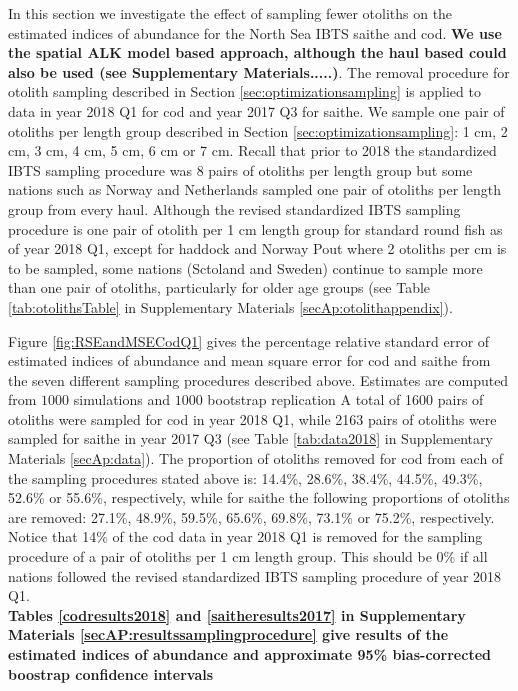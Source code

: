 \documentclass[a4paper 12pt]{article}
\numberwithin{equation}{section}
\begin{document}
In this section we investigate the effect of sampling fewer otoliths on the estimated indices of abundance for the North Sea IBTS saithe and cod. {\bf We use the spatial ALK model based approach, although the haul based could also be used (see Supplementary Materials.....)}. The removal procedure for otolith sampling described in Section \ref{sec:optimizationsampling} is applied to data in year 2018 Q1 for cod and year 2017 Q3 for saithe. We sample one pair of otoliths per length group described in Section \ref{sec:optimizationsampling}: 1 cm, 2 cm, 3 cm, 4 cm, 5 cm, 6 cm or 7 cm. Recall that prior to 2018 the standardized IBTS sampling procedure was 8 pairs of otoliths per length group but some nations such as Norway and Netherlands sampled one pair of otoliths per length group from every haul. Although the revised standardized IBTS sampling procedure is one pair of otolith per 1 cm length group for standard round fish as of year 2018 Q1, except for haddock and Norway Pout where 2 otoliths per cm is to be sampled, some nations (Sctoland and Sweden) continue to sample more than one pair of otoliths, particularly for older age groups (see Table \ref{tab:otolithsTable} in Supplementary Materials \ref{secAp:otolithappendix}).

Figure \ref{fig:RSEandMSECodQ1} gives the percentage relative standard error of estimated indices of abundance and mean square error for cod and saithe from the seven different sampling procedures described above. Estimates are computed from $1000$ simulations and $1000$ bootstrap replication A total of 1600 pairs of otoliths were sampled for cod in year 2018 Q1, while 2163 pairs of otoliths were sampled for saithe in year 2017 Q3 (see Table \ref{tab:data2018} in Supplementary Materials \ref{secAp:data}). The proportion of otoliths removed for cod from each of the sampling  procedures stated above is: 14.4\%, 28.6\%, 38.4\%, 44.5\%, 49.3\%, 52.6\% or 55.6\%, respectively, while for saithe the following proportions of otoliths are removed: 27.1\%, 48.9\%, 59.5\%, 65.6\%, 69.8\%, 73.1\% or 75.2\%, respectively. Notice that 14\% of the cod data in year 2018 Q1 is removed for the sampling procedure of a pair of otoliths per 1 cm length group. This should be 0\% if all nations followed the revised standardized IBTS sampling procedure of year 2018 Q1. \\

{\bf Tables \ref{codresults2018} and \ref{saitheresults2017} in Supplementary Materials \ref{secAP:resultssamplingprocedure}  give results of the estimated indices of abundance and approximate 95\% bias-corrected boostrap confidence intervals }
\end{document}
